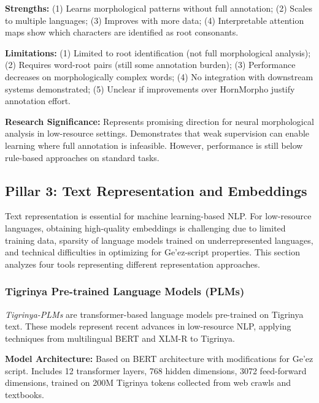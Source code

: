 \documentclass[12pt,a4paper]{article}
\theoremstyle{plain}
\theoremstyle{definition}
\newcommand{\tooldesc}[1]{{\textit{#1}}}
\begin{document}
\textbf{Strengths:} (1) Learns morphological patterns without full annotation; (2) Scales to multiple languages; (3) Improves with more data; (4) Interpretable attention maps show which characters are identified as root consonants.

\textbf{Limitations:} (1) Limited to root identification (not full morphological analysis); (2) Requires word-root pairs (still some annotation burden); (3) Performance decreases on morphologically complex words; (4) No integration with downstream systems demonstrated; (5) Unclear if improvements over HornMorpho justify annotation effort.

\textbf{Research Significance:} Represents promising direction for neural morphological analysis in low-resource settings. Demonstrates that weak supervision can enable learning where full annotation is infeasible. However, performance is still below rule-based approaches on standard tasks.


\subsection{Pillar 3: Text Representation and Embeddings}
\label{subsec:pillar3}

Text representation is essential for machine learning-based NLP. For low-resource languages, obtaining high-quality embeddings is challenging due to limited training data, sparsity of language models trained on underrepresented languages, and technical difficulties in optimizing for Ge'ez-script properties. This section analyzes four tools representing different representation approaches.

\subsubsection{Tigrinya Pre-trained Language Models (PLMs)}

\tooldesc{Tigrinya-PLMs} are transformer-based language models pre-trained on Tigrinya text. These models represent recent advances in low-resource NLP, applying techniques from multilingual BERT and XLM-R to Tigrinya.

\textbf{Model Architecture:} Based on BERT architecture with modifications for Ge'ez script. Includes 12 transformer layers, 768 hidden dimensions, 3072 feed-forward dimensions, trained on 200M Tigrinya tokens collected from web crawls and textbooks.
\end{document}

